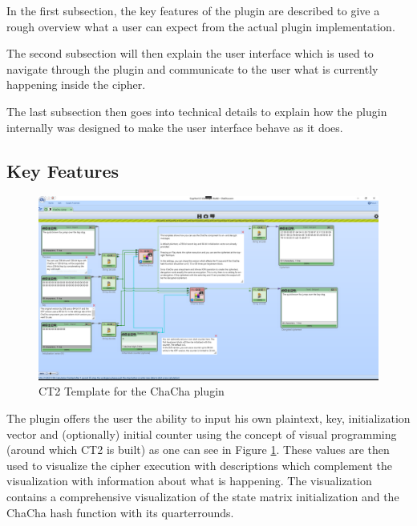 In the first subsection, the key features of the plugin are described to give a rough overview what a user can expect from the actual plugin implementation.

\par

The second subsection will then explain the user interface which is used to navigate through the plugin and communicate to the user what is currently happening inside the cipher.

\par

The last subsection then goes into technical details to explain how the plugin internally was designed to make the user interface behave as it does.


\subsection{Key Features}
\label{sec:keyFeatures}

\begin{figure}
\caption{CT2 Template for the ChaCha plugin}
\label{plugin.template}
\includegraphics[width=\textwidth]{figures/plugin-template.png}
\end{figure}

The plugin offers the user the ability to input his own plaintext, key, initialization vector and (optionally) initial counter using the concept of visual programming (around which CT2 is built) as one can see in Figure \ref{plugin.template}. These values are then used to visualize the cipher execution with descriptions which complement the visualization with information about what is happening. The visualization contains a comprehensive visualization of the state matrix initialization and the ChaCha hash function with its quarterrounds.

